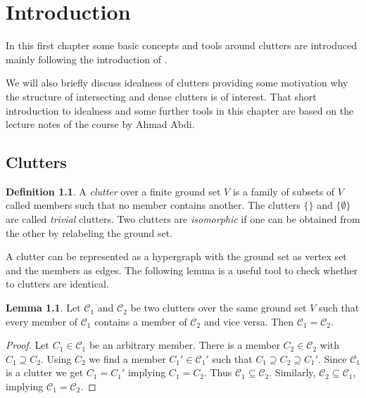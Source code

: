 \documentclass[a4paper, 12pt, twoside=false]{scrbook}
\theoremstyle{definition}
\newtheorem*{definition}{Definition}
\newtheorem{lemma}[theorem]{Lemma}
\begin{document}
   \tableofcontents
   \chapter{Introduction}
   In this first chapter some basic concepts and tools around clutters are introduced mainly following the introduction of \cite{restrictions}.

   We will also briefly discuss idealness of clutters providing some motivation why the structure of intersecting and dense clutters is of interest. That short introduction to idealness and some further tools in this chapter are based on the lecture notes of the course  by Ahmad Abdi\cite{course}.
   \section{Clutters}
   \begin{definition}
       A \emph{clutter} over a finite ground set $V$ is a family of subsets of $V$ called members such that no member contains another\cite{blocker}.
       The clutters $\{\}$ and $\{\emptyset\}$ are called \emph{trivial} clutters.
       Two clutters are \emph{isomorphic} if one can be obtained from the other by relabeling the ground set.
   \end{definition}
   A clutter can be represented as a hypergraph with the ground set as vertex set and the members as edges.
   The following lemma is a useful tool to check whether to clutters are identical.
   \begin{lemma}\label{equalclutters}
       Let $\mathcal{C}_1$ and $\mathcal{C}_2$ be two clutters over the same ground set $V$ such that every member of $\mathcal{C}_1$ contains a member of $\mathcal{C}_2$ and vice versa.
       Then $\mathcal{C}_1=\mathcal{C}_2$.
   \end{lemma}

   \begin{proof}
       Let $C_1 \in \mathcal{C}_1$ be an arbitrary member.
       There is a member $C_2 \in \mathcal{C}_2$ with $C_1 \supseteq C_2$.
       Using $C_2$ we find a member $C_1' \in \mathcal{C}_1'$ such that $C_1 \supseteq C_2 \supseteq C_1'$.
       Since $\mathcal{C}_1$ is a clutter we get $C_1=C_1'$ implying $C_1=C_2$.
       Thus $\mathcal{C}_1 \subseteq \mathcal{C}_2$.
       Similarly, $\mathcal{C}_2 \subseteq \mathcal{C}_1$, implying $\mathcal{C}_1=\mathcal{C}_2$.
   \end{proof}
\end{document}
